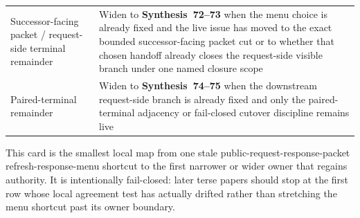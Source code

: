 \documentclass[11pt]{article}
\begin{document}
\begin{center}
\begin{tabularx}{\linewidth}{@{}lX@{}}
Successor-facing packet / request-side terminal remainder & Widen to \textbf{Synthesis~72--73} when the menu choice is already fixed and the live issue has moved to the exact bounded successor-facing packet cut or to whether that chosen handoff already closes the request-side visible branch under one named closure scope \\
Paired-terminal remainder & Widen to \textbf{Synthesis~74--75} when the downstream request-side branch is already fixed and only the paired-terminal adjacency or fail-closed cutover discipline remains live \\
\bottomrule
\end{tabularx}
\end{center}

This card is the smallest local map from one stale public-request-response-packet refresh-response-menu shortcut to the first narrower or wider owner that regains authority. It is intentionally fail-closed: later terse papers should stop at the first row whose local agreement test has actually drifted rather than stretching the menu shortcut past its owner boundary.
\end{document}
